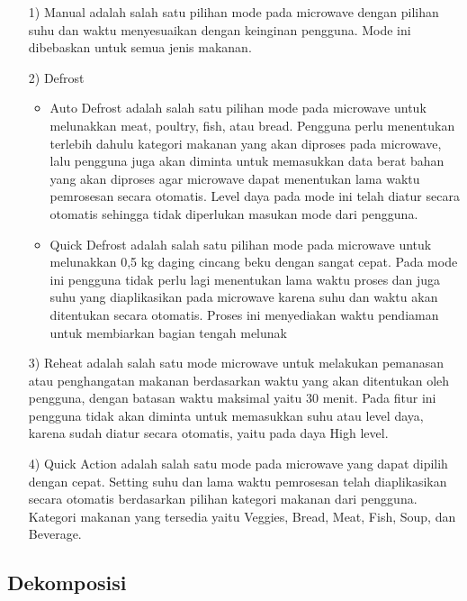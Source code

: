 \documentclass[conference]{IEEEtran}
\begin{document}
\begin{enumerate}
\item[1)]Manual
adalah salah satu pilihan mode pada microwave dengan pilihan suhu dan waktu menyesuaikan dengan keinginan pengguna. 
 Mode ini dibebaskan untuk semua jenis makanan.

\item[2)]Defrost
    \begin{itemize}
    \item Auto Defrost adalah salah satu pilihan mode pada microwave untuk melunakkan meat, poultry, fish, atau bread. Pengguna perlu menentukan 
    terlebih dahulu kategori makanan yang akan diproses pada microwave, lalu pengguna juga akan diminta untuk memasukkan data berat bahan yang akan 
    diproses agar microwave dapat menentukan lama waktu pemrosesan secara otomatis. Level daya pada mode ini telah diatur secara otomatis sehingga tidak 
    diperlukan masukan mode dari pengguna.
    \item Quick Defrost adalah salah satu pilihan mode pada microwave untuk melunakkan 0,5 kg daging cincang beku dengan sangat cepat. Pada mode ini pengguna tidak 
    perlu lagi menentukan lama waktu proses dan juga suhu yang diaplikasikan pada microwave karena suhu dan waktu akan ditentukan secara otomatis. Proses ini 
    menyediakan waktu pendiaman untuk membiarkan bagian tengah melunak
    \end{itemize}

\item[3)]Reheat
adalah salah satu mode microwave untuk melakukan pemanasan atau penghangatan makanan berdasarkan waktu yang akan ditentukan oleh pengguna, 
dengan batasan waktu maksimal yaitu 30 menit. Pada fitur ini pengguna tidak akan diminta untuk memasukkan suhu atau level daya, karena sudah diatur secara otomatis, 
yaitu pada daya High level.

\item[4)]Quick Action
adalah salah satu mode pada microwave yang dapat dipilih dengan cepat. Setting suhu dan lama waktu pemrosesan telah diaplikasikan secara otomatis berdasarkan pilihan 
kategori makanan dari pengguna. Kategori makanan yang tersedia yaitu Veggies, Bread, Meat, Fish, Soup, dan Beverage.
\end{enumerate}

\subsection{Dekomposisi}
\end{document}

